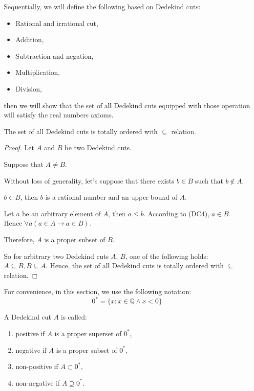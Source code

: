 \par Sequentially, we will define the following based on Dedekind cuts:
\begin{itemize}
    \item Rational and irrational cut,
    \item Addition,
    \item Subtraction and negation,
    \item Multiplication,
    \item Division,
\end{itemize}
\par then we will show that the set of all Dedekind cuts equipped with those operation will satisfy the real numbers axioms.

\begin{theorem}
    The set of all Dedekind cuts is totally ordered with $\subseteq$ relation.
\end{theorem}

\begin{proof}
    \par Let $A$ and $B$ be two Dedekind cuts.
    \par Suppose that $A\ne B$.
    \par Without loss of generality, let's suppose that there exists $b\in B$ such that $b\notin A$.
    \par $b\in B$, then $b$ is a rational number and an upper bound of $ A$.
    \par Let $a$ be an arbitrary element of $A$, then $a\le b$. According to (DC4), $a\in B$. Hence $\forall a(a\in A\rightarrow a\in B)$.
    \par Therefore, $A$ is a proper subset of $ B$.
    \bigskip
    \par So for arbitrary two Dedekind cuts $A$, $B$, one of the following holds: $A\subseteq B, B\subseteq A$. Hence, the set of all Dedekind cuts is totally ordered with $\subseteq$ relation.
\end{proof}

\par For convenience, in this section, we use the following notation:
\[
    {0}^{*} = \{ x : x\in\mathbb{Q} \wedge x < 0 \}
\]

\begin{definition}
    A Dedekind cut $A$ is called:
    \begin{enumerate}[label = (\roman*)]
        \item positive if $A$ is a proper superset of ${0}^{*}$,
        \item negative if $A$ is a proper subset of ${0}^{*}$,
        \item non-positive if $A\subset {0}^{*}$,
        \item non-negative if $A\supseteq {0}^{*}$.
    \end{enumerate}
\end{definition}

